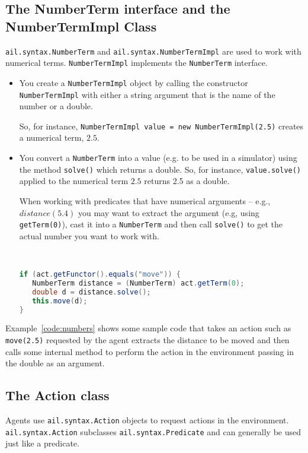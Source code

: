 \subsection{The NumberTerm interface and the NumberTermImpl Class}
\texttt{ail.syntax.NumberTerm} and \texttt{ail.syntax.NumberTermImpl} are used to work with numerical terms.  \texttt{NumberTermImpl} implements the \texttt{NumberTerm} interface. 
\begin{itemize}
\item You create a \texttt{NumberTermImpl} object by calling the constructor \texttt{NumberTermImpl} with either a string argument that is the name of the number or a double.

So, for instance, \texttt{NumberTermImpl value = new NumberTermImpl(2.5)} creates a numerical term, $2.5$.
\item You convert a \texttt{NumberTerm} into a value (e.g. to be used in a simulator) using the method \texttt{solve()} which returns a double.  So, for instance, \texttt{value.solve()} applied to the numerical term $2.5$ returns 2.5 as a double.

When working with predicates that have numerical arguments -- e.g., $distance(5.4)$ you may want to extract the argument (e.g, using \texttt{getTerm(0)}), cast it into a \texttt{NumberTerm} and then call \texttt{solve()} to get the actual number you want to work with.
\begin{ourexample}
\label{code:numbers} \quad \\
\begin{lstlisting}[basicstyle=\sffamily,language=Java,style=easslisting]
if (act.getFunctor().equals("move")) {
   NumberTerm distance = (NumberTerm) act.getTerm(0);
   double d = distance.solve();
   this.move(d);
}
\end{lstlisting}
\end{ourexample}
\end{itemize}
Example~\ref{code:numbers} shows some sample code that takes an action such as \texttt{move(2.5)} requested by the agent extracts the distance to be moved and then calls some internal method to perform the action in the environment passing in the double as an argument.

\subsection{The Action class}
Agents use \texttt{ail.syntax.Action} objects to request actions in the environment.  \texttt{ail.syntax.Action} subclasses \texttt{ail.syntax.Predicate} and can generally be used just like a predicate.

